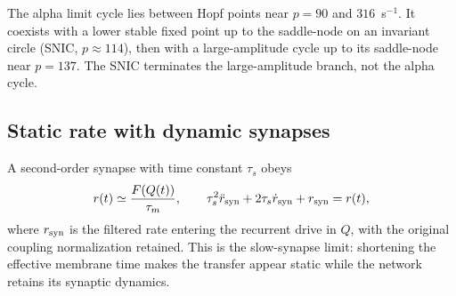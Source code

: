 \documentclass[11pt,a4paper]{article}
\begin{document}
The alpha limit cycle lies between Hopf points near $p=90$ and
$316$~s$^{-1}$. It coexists with a lower stable fixed point up to the
saddle-node on an invariant circle (SNIC, $p\approx114$), then with a
large-amplitude cycle up to its saddle-node near $p=137$. The SNIC
terminates the large-amplitude branch, not the alpha cycle.


\subsection{Static rate with dynamic synapses}
A second-order synapse with time constant $\tau_s$ obeys
\begin{equation}
r(t)\simeq \frac{F(Q(t))}{\tau_m},\qquad
\tau_s^2\ddot r_{\rm syn}+2\tau_s\dot r_{\rm syn}+r_{\rm syn}=r(t),
\label{eq:slow_synapse}
\end{equation}
where $r_{\rm syn}$ is the filtered rate entering the recurrent drive in $Q$, with the original
coupling normalization retained. This is the slow-synapse limit: shortening the
effective membrane time makes the transfer appear static while the network retains
its synaptic dynamics.
\end{document}
